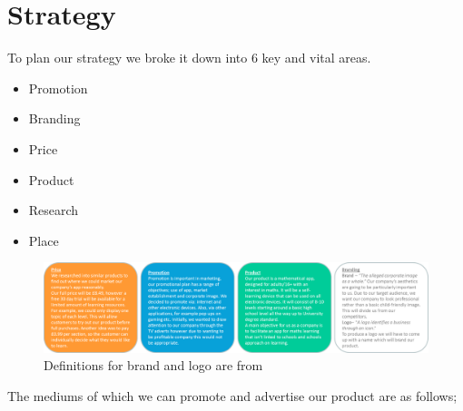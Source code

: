\documentclass[10pt, a4paper]{article}
\begin{document}
\section{Strategy}
To plan our strategy we broke it down into 6 key and vital areas. \\
\begin{itemize}
	\item Promotion
	\item Branding
	\item Price
	\item Product 
	\item Research
	\item Place
\end{itemize}

\begin{figure}[H]
	\begin{center}
		\includegraphics[width=190mm]{images/Picture7.png}
		\caption{Definitions for brand and logo are from \cite{brandinglogo}}
	\end{center}
\end{figure}

The mediums of which we can promote and advertise our product are as follows;\\
\end{document}
